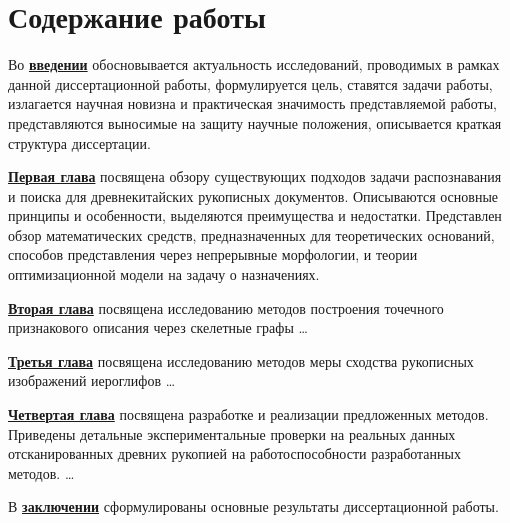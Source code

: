 \section*{Содержание работы}
Во \underline{\textbf{введении}} обосновывается актуальность
исследований, проводимых в рамках данной диссертационной работы,
формулируется цель, ставятся задачи работы, излагается научная новизна
и практическая значимость представляемой работы, представляются выносимые на защиту научные положения, описывается краткая структура диссертации.

\underline{\textbf{Первая глава}} посвящена обзору существующих подходов задачи распознавания и поиска для древнекитайских рукописных документов. Описываются основные принципы и особенности, выделяются преимущества и недостатки. Представлен обзор математических средств, предназначенных для теоретических оснований, способов представления через непрерывные морфологии, и теории оптимизационной модели на задачу о назначениях.

\underline{\textbf{Вторая глава}} посвящена исследованию методов построения точечного признакового описания через скелетные графы \dots

\underline{\textbf{Третья глава}} посвящена исследованию методов меры сходства рукописных изображений иероглифов \dots

\underline{\textbf{Четвертая глава}} посвящена разработке и реализации предложенных методов. Приведены детальные экспериментальные проверки на реальных данных отсканированных древних рукопией на работоспособности разработанных методов. \dots

В \underline{\textbf{заключении}} сформулированы основные результаты диссертационной работы.






